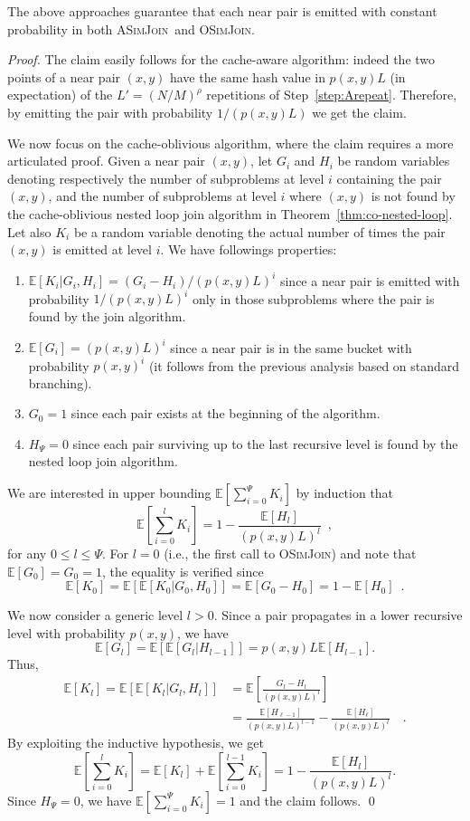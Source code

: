 \documentclass{llncs}
\newcommand{\E}[1]{\mathbb{E}\left[#1\right]}
\newcommand{\SimJoin}{\textsc{OSimJoin}}
\newcommand{\ASimJoin}{\textsc{ASimJoin}}
\begin{document}
\begin{theorem}
The above approaches guarantee that each near pair is emitted with constant probability in both \ASimJoin\ and \SimJoin.
\end{theorem}
\begin{proof}
The claim easily follows for the cache-aware algorithm: indeed the two points of a near pair $(x,y)$ have the same hash value in $p(x,y)L$ (in expectation) of the $L'=(N/M)^\rho$ repetitions of Step~\ref{step:Arepeat}. 
Therefore, by emitting the  pair with probability $1/(p(x,y)L)$ we get the claim.

We now focus on the cache-oblivious algorithm, where the claim requires a more articulated proof. 
Given a near pair $(x,y)$, let $G_i$ and $H_i$ be random variables denoting respectively the number of subproblems at level $i$ containing the pair $(x,y)$, and the number of subproblems at level $i$ where $(x,y)$ is not found by the cache-oblivious nested loop join algorithm in Theorem~\ref{thm:co-nested-loop}.
Let also $K_i$ be a random variable denoting the actual number of times the pair $(x,y)$ is emitted at level $i$. 
We have followings properties: 
\begin{enumerate}
	\item $\E{K_i| G_i,H_i}=(G_i-H_i)/(p(x,y)L)^i$ since a near pair is emitted with probability $1/(p(x,y)L)^i$ only in those subproblems where the pair is found by the join algorithm.
	\item $\E{G_i}=(p(x,y)L)^i$ since a near pair is in the same bucket with probability $p(x,y)^i$ (it follows from the previous analysis based on standard branching).
	\item $G_0=1$ since each pair exists at the beginning of the algorithm.
	\item $H_\Psi=0$ since each pair surviving up to the last recursive level is found by the nested loop join algorithm.
\end{enumerate}

We are interested in upper bounding $\E{\sum_{i=0}^{\Psi} K_i}$ by induction that
$$\E{\sum_{i=0}^{l} K_i}=1-\frac{\E{H_l}}{(p(x,y)L)^l} \enspace ,$$
for any $0\leq l\leq \Psi$.
For $l=0$ (i.e., the first call to \SimJoin) and note that $\E{G_0}=G_0=1$, the equality is verified since
$$
\E{K_0}=\E{\E{K_0 | G_0, H_0}} = \E{G_0-H_0} = 1-\E{H_0} \enspace.
$$

We now consider a generic level $l>0$. 
Since a pair  propagates in a lower recursive level with probability $p(x,y)$, we have \[\E{G_l} = \E{\E{G_l | H_{l-1}}} = p(x,y)L\E{H_{l-1}}\text{.}\] 
Thus,
\begin{align*}
\E{K_l} = \E{\E{K_l|G_{l},H_{l}}} &=
\E{\frac{G_{l}-H_{l}}{(p(x,y)L)^l}} \\ &=
\frac{\E{H_{\ell-1}}}{(p(x,y)L)^{l-1}} -
\frac{\E{H_{\ell}}}{{(p(x,y)L)^l}} \enspace \enspace .
\end{align*}
By exploiting the inductive hypothesis, we get
$$
\E{\sum_{i=0}^{l} K_i}=
\E{K_l}+\E{\sum_{i=0}^{l-1} K_i}=
1-\frac{\E{H_l}}{(p(x,y)L)^l}.$$
Since $H_\Psi=0$, we have $\E{\sum_{i=0}^{\Psi} K_i}=1$ and the claim follows. \qed
\end{proof}
\end{document}
